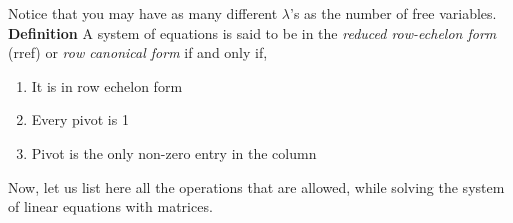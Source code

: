 \documentclass{article}
\begin{document}
Notice that you may have as many different $\lambda$'s as the number of free variables.\\

\textbf{Definition}
A system of equations is said to be in the \textit{reduced row-echelon form} (rref) or \textit{row canonical form} if and only if,
\begin{enumerate}
    \item It is in row echelon form
    \item Every pivot is 1
    \item Pivot is the only non-zero entry in the column
\end{enumerate}
Now, let us list here all the operations that are allowed, while solving the system of linear equations with matrices.
\end{document}
